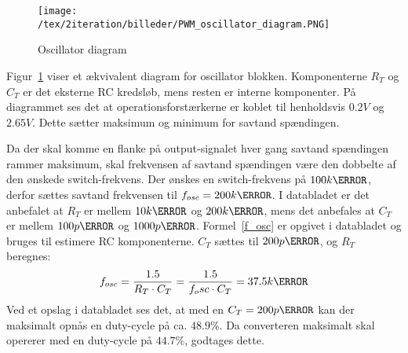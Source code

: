 \begin{figure}[H]
	\center
	\texttt{[image: /tex/2iteration/billeder/PWM\_oscillator\_diagram.PNG]}
	\caption{Oscillator diagram}
	\label{fig:PWM_oscillator_diagram}
\end{figure}

Figur~\ref{fig:PWM_oscillator_diagram} viser et ækvivalent diagram for oscillator blokken. Komponenterne $R_T$ og $C_T$ er det eksterne RC kredsløb, mens resten er interne komponenter. På diagrammet ses det at operationsforstærkerne er koblet til henholdsvis $0.2V$ og $2.65V$. Dette sætter maksimum og minimum for savtand spændingen. 

Da der skal komme en flanke på output-signalet hver gang savtand spændingen rammer maksimum, skal frekvensen af savtand spændingen være den dobbelte af den ønskede switch-frekvens. Der ønskes en switch-frekvens på $100k\hertz$, derfor sættes savtand frekvensen til $f_{osc}=200k\hertz$. I databladet er det anbefalet at $R_T$ er mellem $10k\ohm$ og $200k\ohm$, mens det anbefales at $C_T$ er mellem $100p\farad$ og $1000p\farad$. Formel~\ref{f_osc} er opgivet i databladet og bruges til estimere RC komponenterne. $C_T$ sættes til $200p\farad$, og $R_T$ beregnes:
\begin{equation} \label{f_osc}
f_{osc} = \frac{1.5}{R_T\cdot C_T} = \frac{1.5}{f_osc \cdot C_T} = 37.5k\ohm
\end{equation}
Ved et opslag i databladet ses det, at med en $C_T=200p\farad$ kan der maksimalt opnås en duty-cycle på ca. $48.9\percent$. Da converteren maksimalt skal opererer med en duty-cycle på $44.7\percent$, godtages dette.





